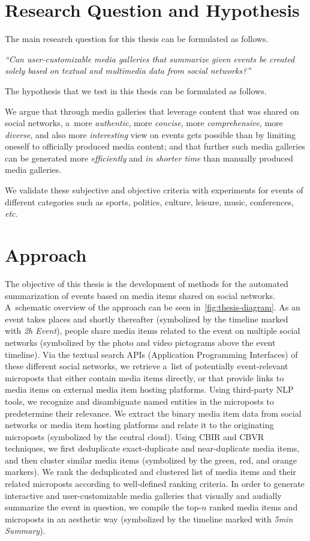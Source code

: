\section{Research Question and Hypothesis}

The main research question for this thesis
can be formulated as follows.

\textit{``Can user-customizable
media galleries that summarize given events be
created solely based on textual and multimedia data
from social networks?''}

\noindent The hypothesis that we test in this thesis
can be formulated as follows.

We argue that through media galleries that leverage content
that was shared on social networks,
a~more \emph{authentic}, more \emph{concise},
more \emph{comprehensive}, more \emph{diverse},
and also more \emph{interesting}
view on events gets possible than by limiting oneself
to officially produced media content;
and that further such media galleries can be generated
more \emph{efficiently} and \emph{in shorter time}
than manually produced media galleries.

We validate these subjective and objective
criteria with experiments for events of different categories
such as sports, politics, culture, leisure,
music, conferences, \emph{etc.}

\section{Approach}

The objective of this thesis is the development
of methods for the automated summarization of events
based on media items shared on social networks.
A~schematic overview of the approach can be seen
in~\autoref{fig:thesis-diagram}.
As an event takes places and shortly thereafter
(symbolized by the timeline marked with \emph{2h Event}),
people share media items related to the event
on multiple social networks
(symbolized by the photo and video pictograms
above the event timeline).
Via the textual search APIs (Application Programming Interfaces)
of these different social networks,
we retrieve a~list of potentially event-relevant
microposts that either contain media items directly,
or that provide links to media items
on external media item hosting platforms.
Using third-party NLP tools,
we recognize and disambiguate named entities
in the microposts to predetermine their relevance.
We extract the binary media item data
from social networks or media item hosting platforms
and relate it to the originating microposts
(symbolized by the central cloud).
Using CBIR and CBVR techniques, we first deduplicate
exact-duplicate and near-duplicate media items,
and then cluster similar media items
(symbolized by the green, red, and orange markers).
We rank the deduplicated and clustered list
of media items and their related microposts
according to well-defined ranking criteria.
In order to generate interactive and user-customizable
media galleries that visually and audially summarize the
event in question, we compile the top-$n$ ranked
media items and microposts in an aesthetic way
(symbolized by the timeline marked with \emph{5min Summary}).


